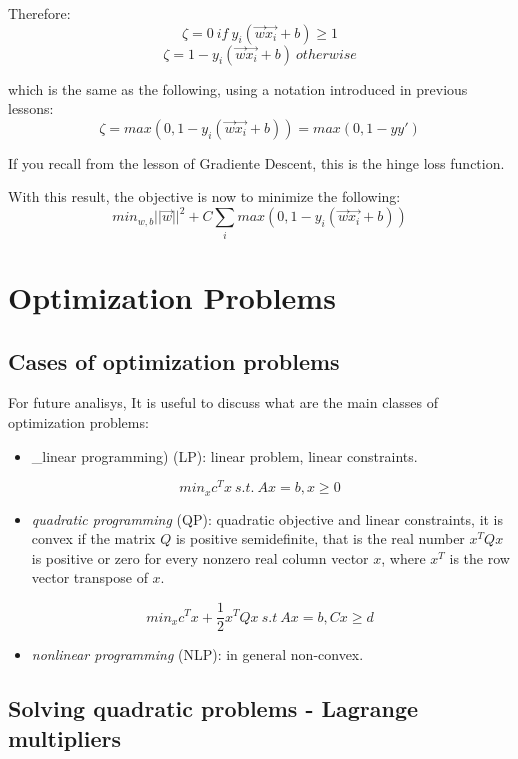 \documentclass[11pt]{article}
\begin{document}
Therefore: \[\zeta = 0\ if\ y_i(\vec{w}\vec{x_i}+b) \ge 1\]
\[\zeta = 1 - y_i(\vec{w}\vec{x_i}+b)\ otherwise\]

which is the same as the following, using a notation introduced in
previous lessons:
\[\zeta = max(0, 1-y_i(\vec{w}\vec{x_i}+b)) = max(0, 1-yy')\]

If you recall from the lesson of Gradiente Descent, this is the hinge
loss function.

With this result, the objective is now to minimize the following:
\[min_{w, b} ||\vec{w}||^2 + C \sum_i max(0, 1 - y_i(\vec{w}\vec{x_i} +b))\]

\section{Optimization Problems}\label{optimization-problems}

\subsection{Cases of optimization
problems}\label{cases-of-optimization-problems}

For future analisys, It is useful to discuss what are the main classes
of optimization problems:

\begin{itemize}
\tightlist
\item
  \_linear programming) (LP): linear problem, linear constraints.
\end{itemize}

\[min_{x} c^Tx\ s.t.\ Ax = b, x \ge 0\]

\begin{itemize}
\tightlist
\item
  \emph{quadratic programming} (QP): quadratic objective and linear
  constraints, it is convex if the matrix \(Q\) is positive
  semidefinite, that is the real number \(x^TQx\) is positive or zero
  for every nonzero real column vector \(x\), where \(x^T\) is the row
  vector transpose of \(x\).
\end{itemize}

\[min_{x} c^Tx + \frac{1}{2}x^TQx\ s.t\ Ax = b, Cx \ge d\]

\begin{itemize}
\tightlist
\item
  \emph{nonlinear programming} (NLP): in general non-convex.
\end{itemize}

\subsection{Solving quadratic problems - Lagrange
multipliers}\label{solving-quadratic-problems---lagrange-multipliers}
\end{document}
